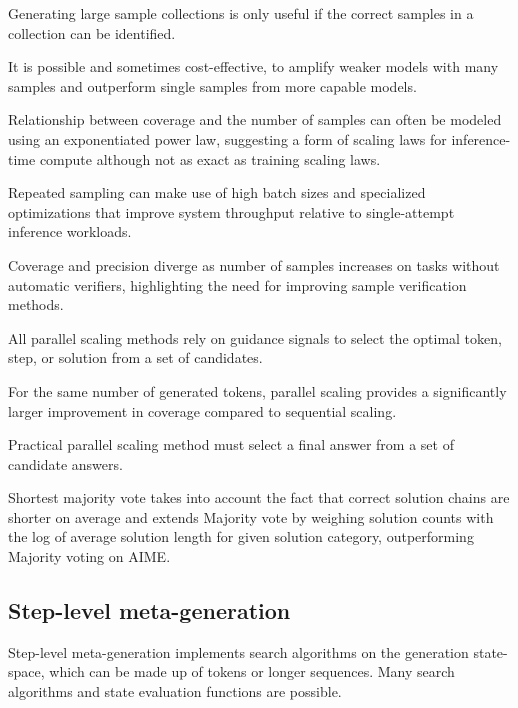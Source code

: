 Generating large sample collections is only useful if the correct samples in a collection can be identified. \cite{brown2024largelanguagemonkeysscaling}

It is possible and sometimes cost-effective, to amplify weaker models with many samples and outperform single samples from more capable models. \cite{brown2024largelanguagemonkeysscaling}

Relationship between coverage and the number of samples can often be modeled using an exponentiated power law, suggesting a form of scaling laws for inference-time compute although not as exact as training scaling laws. \cite{brown2024largelanguagemonkeysscaling}

Repeated sampling can make use of high batch sizes and specialized optimizations that improve system throughput relative to single-attempt inference workloads. \cite{brown2024largelanguagemonkeysscaling}

Coverage and precision diverge as number of samples increases on tasks without automatic verifiers, highlighting the need for improving sample verification methods. \cite{brown2024largelanguagemonkeysscaling}


All parallel scaling methods rely on guidance signals to select the optimal token, step, or solution from a set of candidates. \cite{zeng2025revisitingtesttimescalingo1like}

For the same number of generated tokens, parallel scaling provides a significantly larger improvement in coverage compared to sequential scaling. \cite{zeng2025revisitingtesttimescalingo1like}

Practical parallel scaling method must select a final answer from a set of candidate answers. \cite{zeng2025revisitingtesttimescalingo1like}

Shortest majority vote takes into account the fact that correct solution chains are shorter on average and extends Majority vote by weighing solution counts with the log of average solution length for given solution category, outperforming Majority voting on AIME. \cite{zeng2025revisitingtesttimescalingo1like}

\subsection{Step-level meta-generation}
Step-level meta-generation implements search algorithms on the generation state-space, which can be made up of tokens or longer sequences. Many search algorithms and state evaluation functions are possible. \cite{welleck2024decodingmetagenerationinferencetimealgorithms}



